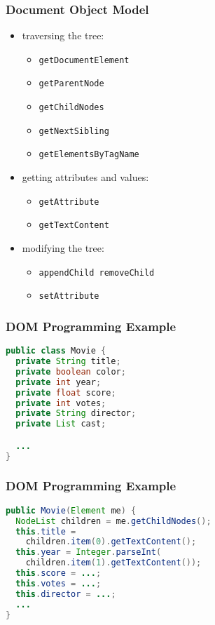 \documentclass[dvipsnames]{beamer}
\theoremstyle{plain}
\begin{document}
\begin{frame}
  \frametitle{Document Object Model}

  \begin{itemize}
    \item traversing the tree:
    \begin{itemize}
      \item \lstinline!getDocumentElement!
      \item \lstinline!getParentNode!
      \item \lstinline!getChildNodes!
      \item \lstinline!getNextSibling!
      \item \lstinline!getElementsByTagName!
    \end{itemize}

    \pause
    \item getting attributes and values:
    \begin{itemize}
      \item \lstinline!getAttribute!
      \item \lstinline!getTextContent!
    \end{itemize}

    \pause
    \item modifying the tree:
    \begin{itemize}
      \item \lstinline!appendChild removeChild!
      \item \lstinline!setAttribute!
    \end{itemize}
  \end{itemize}
\end{frame}

\begin{frame}[fragile]
  \frametitle{DOM Programming Example}

  \begin{example}
    \begin{lstlisting}[language=Java]
public class Movie {
  private String title;
  private boolean color;
  private int year;
  private float score;
  private int votes;
  private String director;
  private List cast;

  ...
}
    \end{lstlisting}
  \end{example}
\end{frame}

\begin{frame}[fragile]
  \frametitle{DOM Programming Example}

  \begin{example}
    \begin{lstlisting}[language=Java]
public Movie(Element me) {
  NodeList children = me.getChildNodes();
  this.title =
    children.item(0).getTextContent();
  this.year = Integer.parseInt(
    children.item(1).getTextContent());
  this.score = ...;
  this.votes = ...;
  this.director = ...;
  ...
}
    \end{lstlisting}
  \end{example}
\end{frame}
\end{document}
